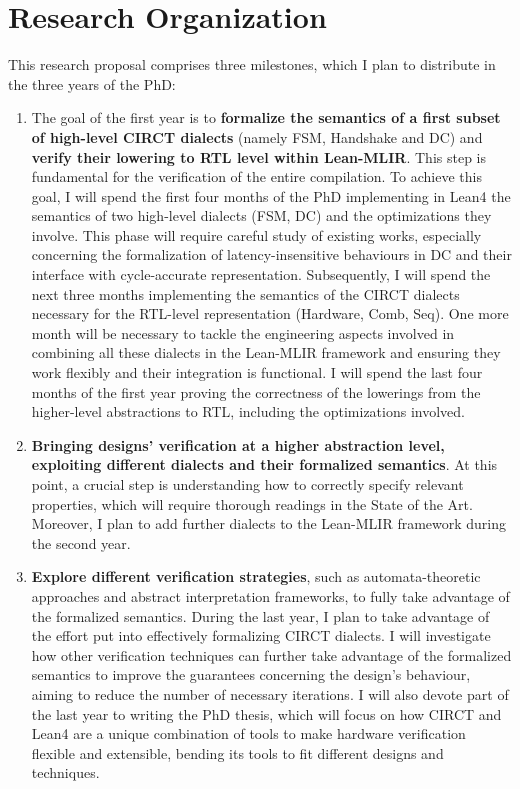 \documentclass[sigconf,authorversion,nonacm, 11pt]{acmart}
\begin{document}
\section{Research Organization}

This research proposal comprises three milestones, which I plan to distribute in the three years of the PhD: 
\begin{enumerate}
    \item The goal of the first year is to \textbf{formalize the semantics of a first subset of high-level CIRCT dialects} (namely FSM, Handshake and DC) 
 and \textbf{verify their lowering to RTL level within Lean-MLIR}. This step is fundamental for the verification of the entire compilation. 
 To achieve this goal, I will spend the first four months of the PhD implementing in Lean4 the semantics of two high-level dialects (FSM, DC) and 
 the optimizations they involve. This phase will require careful study of existing works, especially concerning the formalization of latency-insensitive 
 behaviours in DC and their interface with cycle-accurate representation. 
 Subsequently, I will spend the next three months implementing the semantics of the CIRCT dialects necessary for the RTL-level representation (Hardware, Comb, Seq). 
 One more month will be necessary to tackle the engineering aspects involved in combining all these dialects in the Lean-MLIR framework and ensuring they work 
 flexibly and their integration is functional. I will spend the last four months of the first year proving the correctness of the lowerings from the higher-level 
 abstractions to RTL, including the optimizations involved. 
    \item \textbf{Bringing designs’ verification at a higher abstraction level, exploiting different dialects and their formalized semantics}. 
 At this point, a crucial step is understanding how to correctly specify relevant properties, which will require thorough readings in the State of the Art. 
 Moreover, I plan to add further dialects to the Lean-MLIR framework during the second year. 
    \item \textbf{Explore different verification strategies}, such as automata-theoretic approaches and abstract interpretation frameworks, 
 to fully take advantage of the formalized semantics. During the last year, I plan to take advantage of the effort put into effectively formalizing CIRCT dialects. 
 I will investigate how other verification techniques can further take advantage of the formalized semantics to improve the 
 guarantees concerning the design’s behaviour, aiming to reduce the number of necessary iterations. 
 I will also devote part of the last year to writing the PhD thesis, which will focus on how CIRCT and Lean4 are 
 a unique combination of tools to make hardware verification flexible and extensible, bending its tools to fit 
 different designs and techniques.
\end{enumerate}

\thispagestyle{empty}


\thispagestyle{empty}
\end{document}
